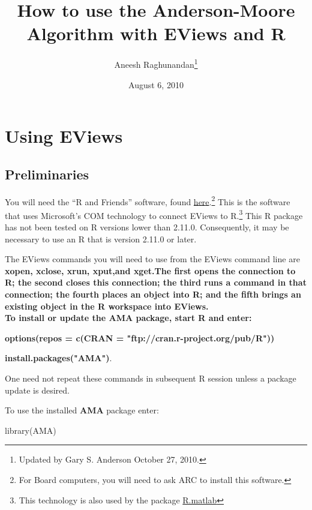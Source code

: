 \documentclass[12pt]{article}
\title{How to use the Anderson-Moore \\Algorithm with EViews and R}
\author{Aneesh Raghunandan\thanks{Updated by Gary S. Anderson October 27, 2010.}}
\date{August 6, 2010  }
\begin{document}
\maketitle
\section{Using EViews}
\subsection{Preliminaries} 
You will need the ``R and Friends'' software, found \href{http://rcom.univie.ac.at/download.html}{here}.\footnote{For Board computers, you will need to ask ARC to install this software.}  This is the software that uses Microsoft's COM technology to connect EViews to R.\footnote{This technology is also used by the
package \href{http://cran.r-project.org/web/packages/R.matlab/index.html}{R.matlab}}
This R package has not been tested on  R versions lower than 2.11.0.  Consequently,
it may be necessary  to use  an R that is version 2.11.0 or later.
 
The EViews commands you will need to use from the EViews command line are \bfseries xopen, xclose, xrun, xput,\normalfont and \bfseries xget.\normalfont  The first opens the connection to R; the second closes this connection; the third runs a command in that connection; the fourth places an object into R; and the fifth brings an existing object in the R workspace into EViews. \\

To install or update the {\bf AMA} package, start R and enter:

{\bf options(repos = c(CRAN = "ftp://cran.r-project.org/pub/R")) }

{\bf install.packages("AMA")}. 


One need not repeat these commands in subsequent R session unless a package
update is desired.

\vspace{0.15in}

To use the installed {\bf AMA} package enter:

library(AMA)




\end{document}
